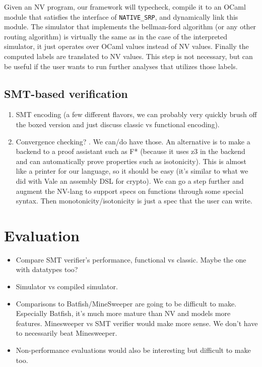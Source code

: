 \documentclass[sigconf,10pt]{acmart}
\begin{document}
Given an NV program, our framework will typecheck, compile it to an OCaml module
that satisfies the interface of \texttt{NATIVE\_SRP}, and dynamically link this
module. The simulator that implements the bellman-ford algorithm (or any other
routing algorithm) is virtually the same as in the case of the interpreted
simulator, it just operates over OCaml values instead of NV values. Finally the
computed labels are translated to NV values. This step is not necessary, but can
be useful if the user wants to run further analyses that utilizes those labels.



\subsection{SMT-based verification}
\begin{enumerate}
  \item SMT encoding (a few different flavors, we can probably very quickly brush off the boxed version and just discuss classic vs functional encoding).
  \item Convergence checking? . We can/do have those. An alternative is to make a backend to a proof assistant such as F* (because it uses z3 in the backend and can automatically prove properties such as isotonicity). This is almost like a printer for our language, so it should be easy (it's similar to what we did with Vale an assembly DSL for crypto). We can go a step further and augment the NV-lang to support specs on functions through some special syntax. Then monotonicity/isotonicity is just a spec that the user can write.
\end{enumerate}

%
%
%
%

\section{Evaluation}
\label{sec:evaluation}

\begin{itemize}
  \item Compare SMT verifier's performance, functional vs classic. Maybe the one with datatypes too?
  \item Simulator vs compiled simulator.
  \item Comparisons to Batfish/MineSweeper are going to be difficult to make. Especially Batfish, it's much more mature than NV and models more features. Minesweeper vs SMT verifier would make more sense. We don't have to necessarily beat Minesweeper.
  \item Non-performance evaluations would also be interesting but difficult to make too.
\end{itemize}
\end{document}
